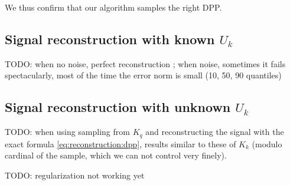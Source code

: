 \documentclass{article}
\begin{document}
We thus confirm that our algorithm samples the right DPP.

\subsection[Signal reconstruction with known Uk]{Signal reconstruction with known $U_k$}


TODO: when no noise, perfect reconstruction ; when noise, sometimes it fails spectacularly, most of the time the error norm is small (10, 50, 90 quantiles)


\subsection[Signal reconstruction with unknown Uk]{Signal reconstruction with unknown $U_k$}


TODO: when using sampling from $K_q$ and reconstructing the signal with the exact formula \eqref{eq:reconstruction:dpp}, results similar to these of $K_k$ (modulo cardinal of the sample, which we can not control very finely).


TODO: regularization not working yet

	
	
 

\end{document}
